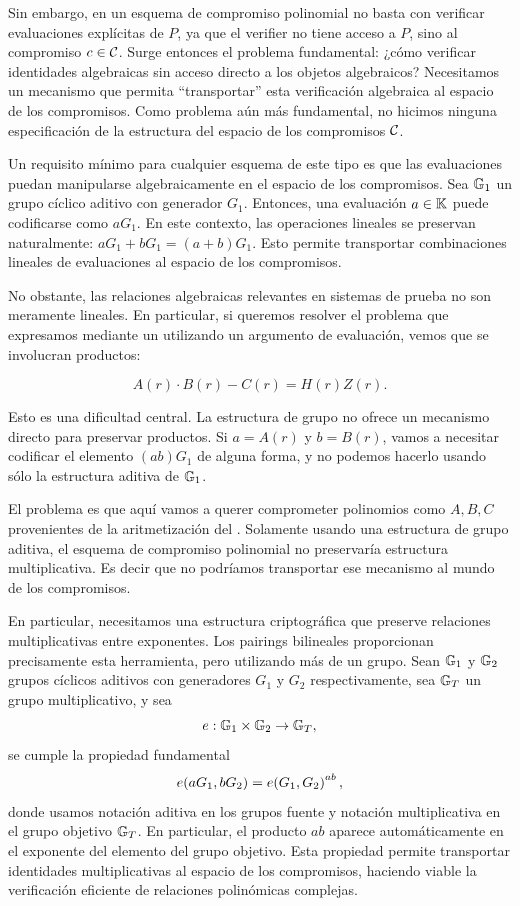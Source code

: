 Sin embargo, en un esquema de compromiso polinomial no basta con verificar evaluaciones explícitas de $P$, ya que el verifier no tiene acceso a $P$, sino al compromiso $c \in \mathcal{C}$. Surge entonces el problema fundamental: ¿cómo verificar identidades algebraicas sin acceso directo a los objetos algebraicos? Necesitamos un mecanismo que permita “transportar” esta verificación algebraica al espacio de los compromisos. Como problema aún más fundamental, no hicimos ninguna especificación de la estructura del espacio de los compromisos $\mathcal{C}$.

Un requisito mínimo para cualquier esquema de este tipo es que las evaluaciones puedan manipularse algebraicamente en el espacio de los compromisos. Sea $\mathbb{G}_1$ un grupo cíclico aditivo con generador $G_1$. Entonces, una evaluación $a \in \mathbb{K}$ puede codificarse como $aG_1$. En este contexto, las operaciones lineales se preservan naturalmente: $aG_1 + bG_1 = (a + b)G_1$. Esto permite transportar combinaciones lineales de evaluaciones al espacio de los compromisos.

No obstante, las relaciones algebraicas relevantes en sistemas de prueba no son meramente lineales. En particular, si queremos resolver el problema que expresamos mediante un \QAP utilizando un argumento de evaluación, vemos que se involucran productos:

$$A(r) \cdot B(r) - C(r) = H(r)Z(r).$$

Esto es una dificultad central. La estructura de grupo no ofrece un mecanismo directo para preservar productos. Si $a = A(r)$ y $b = B(r)$, vamos a necesitar codificar el elemento $(ab)G_1$ de alguna forma, y no podemos hacerlo usando sólo la estructura aditiva de $\mathbb{G}_1$.

El problema es que aquí vamos a querer comprometer polinomios como $A, B, C$ provenientes de la aritmetización del \QAP. Solamente usando una estructura de grupo aditiva, el esquema de compromiso polinomial no preservaría estructura multiplicativa. Es decir que no podríamos transportar ese mecanismo al mundo de los compromisos.

En particular, necesitamos una estructura criptográfica que preserve relaciones multiplicativas entre exponentes. Los pairings bilineales proporcionan precisamente esta herramienta, pero utilizando más de un grupo. Sean $\mathbb{G}_1$ y $\mathbb{G}_2$ grupos cíclicos aditivos con generadores $G_1$ y $G_2$ respectivamente, sea $\mathbb{G}_T$ un grupo multiplicativo, y sea
$$e: \mathbb{G}_1 \times \mathbb{G}_2 \to \mathbb{G}_T,$$
se cumple la propiedad fundamental
$$e\!\left(aG_1,bG_2\right) = e\!\left(G_1,G_2\right)^{ab},$$
donde usamos notación aditiva en los grupos fuente y notación multiplicativa en el grupo objetivo $\mathbb{G}_T$. En particular, el producto $ab$ aparece automáticamente en el exponente del elemento del grupo objetivo. Esta propiedad permite transportar identidades multiplicativas al espacio de los compromisos, haciendo viable la verificación eficiente de relaciones polinómicas complejas.

